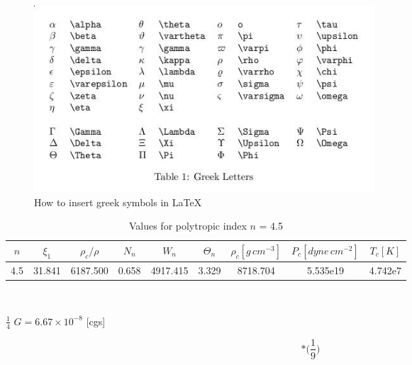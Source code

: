 \documentclass[12pt]{article}
\begin{document}

\begin{figure}[h]   %
\centering
\includegraphics[width=5.0in]{GreekSymbols.jpg}
\caption{How to insert greek symbols in LaTeX}
\label{greek}
\end{figure}


\begin{table}[h]
\caption{Values for polytropic index $n$ = 4.5}
\centering
\begin{tabular}{ c c c c c c c c c  }
 \hline\hline
$n$ & $\xi_1$ & $\rho_c/\rho$ & $N_{n}$ & $W_n$ & $\Theta_n$
& $\rho_c[g\,cm^{-3}]$ & $P_c[dyne\,cm^{-2}]$ & $T_c[K]$ \\
\hline
4.5 & 31.841 & 6187.500 & 0.658 & 4917.415 & 3.329 & 8718.704 &
5.535e19 & 4.742e7 \\
\hline
\end{tabular}\\
\label{table:nonlin}
\end{table}


$\frac{1}{4}$   %
$G = 6.67\times10^{-8}$ [cgs] %
\int %

\begin{equation}* %
    \bigg(\frac{1}{9}\bigg)
\end{equation}
\begin{equation*} %
\end{equation*}
\end{document}
